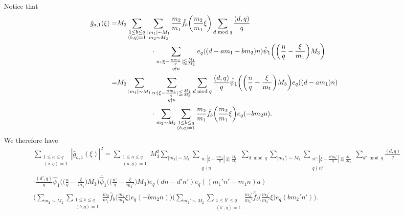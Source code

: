 \documentclass[12pt]{amsart}
\theoremstyle{definition}
\theoremstyle{plain}
\theoremstyle{remark}
\numberwithin{equation}{section}
\numberwithin{theorem}{section}
\numberwithin{equation}{section}
\begin{document}
	Notice that 
	\begin{align*}
		\hat{g}_{a,1}(\xi)=&M_{3}\sum_{\substack{1 \leq b \leq q \\ (b, q)=1}}\sum_{\substack{|m_{1}|\sim M_{1} \\ m_{2}\sim M_{2}}}\frac{m_{2}}{m_{1}}\hat{f}_{b}\bigg(\frac{m_{2}}{m_{1}}\xi\bigg)\sum_{d \bmod q}\frac{(d, q)}{q}
		\notag
		\\
		&\quad\quad\quad\quad\quad\cdot \sum_{\substack{n: |\xi - \frac{nm_{1}}{q}|\lessapprox \frac{M_{1}}{M_{3}} \\ q\nmid n }}e_q((d-am_1-bm_2)n)\hat{\psi}_{1}\bigg(\bigg(\frac{n}{q}-\frac{\xi}{m_{1}}\bigg)M_{3}\bigg)
		\\
		= &M_{3}\sum_{|m_{1}|\sim M_{1}}\sum_{\substack{n: |\xi - \frac{nm_{1}}{q}|\lessapprox \frac{M_{1}}{M_{3}} \\ q\nmid n }}
		\sum_{d \bmod q} \frac{(d, q)}{q}
		\hat{\psi}_{1}\bigg(\bigg(\frac{n}{q}-\frac{\xi}{m_{1}}\bigg)M_{3}\bigg)
		e_q((d-am_{1})n)
		\\
		&\quad\quad\quad\quad\quad\cdot\sum_{m_{2}\sim M_{2}}
		\sum_{\substack{1 \leq b \leq q \\ (b, q)=1}}\frac{m_{2}}{m_{1}}\hat{f}_{b}\bigg(\frac{m_{2}}{m_{1}}\xi\bigg)
		e_q(-bm_{2}n).
	\end{align*}
	We therefore have
	\begin{align*}
		&\sum_{\substack{1 \leq a \leq q \\ (a, q)=1}}|\hat{g}_{a,1}(\xi)|^{2}=\sum_{\substack{1 \leq a \leq q \\ (a, q)=1}}
		M_{3}^{2}\sum_{|m_{1}|\sim M_{1}}\sum_{\substack{n: |\xi - \frac{nm_{1}}{q}|\lessapprox \frac{M_{1}}{M_{3}} \\ q\nmid n }}
		\sum_{d \bmod q}
		\sum_{|m_{1}'|\sim M_{1}}\sum_{\substack{n': |\xi - \frac{n'm_{1}'}{q}|\lessapprox \frac{M_{1}}{M_{3}} \\ q\nmid n' }}
		\sum_{d' \bmod q}\frac{(d, q)}{q}
		\\
		&\cdot\frac{(d', q)}{q}\hat{\psi}_{1}\bigg(\bigg(\frac{n}{q}-\frac{\xi}{m_{1}}\bigg)M_{3}\bigg)
		\overline{\hat{\psi}}_{1}\bigg(\bigg(\frac{n'}{q}-\frac{\xi}{m_{1}'}\bigg)M_{3}\bigg)
		e_q(dn-d'n')
		e_q((m_{1}'n'-m_{1}n)a)
		\\
		&\bigg(\sum_{m_{2}\sim M_{2}}
		\sum_{\substack{1 \leq b \leq q \\ (b, q)=1}}\frac{m_{2}}{m_{1}}\hat{f}_{b}\bigg(\frac{m_{2}}{m_{1}}\xi\bigg)
		e_q(-bm_{2}n)\bigg)\bigg(\sum_{m_{2}'\sim M_{2}}
		\sum_{\substack{1 \leq b' \leq q \\ (b', q)=1}}\frac{m_{2}'}{m_{1}'}\overline{\hat{f}}_{b}\bigg(\frac{m_{2}'}{m_{1}'}\xi\bigg)
		e_q(bm_{2}'n')\bigg).
	\end{align*}
\end{document}
